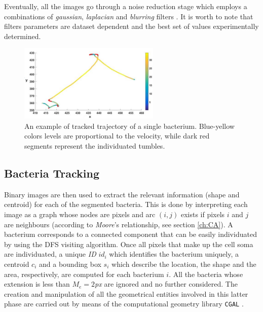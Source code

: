 Eventually, all the images go through a noise reduction stage which employs a combinations of \textit{gaussian}, \textit{laplacian} and \textit{blurring} filters \cite{Deng:1993}.
It is worth to note that filters parameters are dataset dependent and the best set of values experimentally determined. 
    \begin{figure}
    	\includegraphics[width=0.6\textwidth]{./images/bacteria/runtumble.png}
    	\caption{An example of tracked trajectory of a single bacterium. Blue-yellow colors levels are proportional to the velocity, while dark red segments represent the individuated tumbles.}
    	\label{runtumbledetection}
    \end{figure}


\subsection{Bacteria Tracking}

Binary images are then used to extract the relevant information (shape and centroid) for each of the segmented bacteria.
This is done by interpreting each image as a graph whose nodes are pixels and arc $(i,j)$ exists if pixels $i$ and $j$ are neighbours (according to \textit{Moore}'s relationship, see section \ref{ch:CA}).
A bacterium corresponds to a connected component that can be easily individuated by using the DFS visiting algorithm.
Once all pixels that make up the cell soma are individuated, a unique \textit{ID} $id_i$ which identifies the bacterium uniquely, a centroid $c_i$ and a bounding box $s_i$ which describe the location, the shape and the area, respectively, are computed for each bacterium $i$. All the bacteria whose extension is less than $M_e = 2$\textit{px} are ignored and no further considered.
The creation and manipulation of all the geometrical entities involved in this latter phase are carried out by means of the computational geometry library \texttt{CGAL}  \cite{CGAL}.

